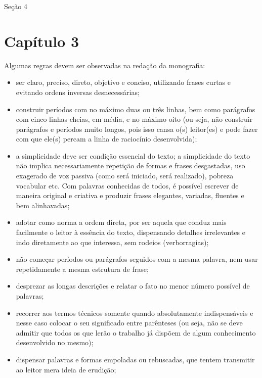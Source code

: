 \documentclass[
	12pt,			%
	openright,		%
	oneside,	
	a4paper,		%
	english,		%
	brazil			%
]{abntex2/abntex2}  %
\begin{document}
		Seção 4

\chapter{Capítulo 3}

	Algumas regras devem ser observadas na redação da monografia:

	\begin{itemize}
		\item ser claro, preciso, direto, objetivo e conciso, utilizando frases curtas e evitando ordens inversas desnecessárias;
		
		\item construir períodos com no máximo duas ou três linhas, bem como parágrafos com cinco linhas cheias, em média, e no máximo oito (ou seja, não construir parágrafos e períodos muito longos, pois isso cansa o(s) leitor(es) e pode fazer com que ele(s) percam a linha de raciocínio desenvolvida);
		
		\item a simplicidade deve ser condição essencial do texto; a simplicidade do texto não implica necessariamente repetição de formas e frases desgastadas, uso exagerado de voz passiva (como será iniciado, será realizado), pobreza vocabular etc. Com palavras conhecidas de todos, é possível escrever de maneira original e criativa e produzir frases elegantes, variadas, fluentes e bem alinhavadas;
		
		\item adotar como norma a ordem direta, por ser aquela que conduz mais facilmente o leitor à essência do texto, dispensando detalhes irrelevantes e indo diretamente ao que interessa, sem rodeios (verborragias);

		\item não começar períodos ou parágrafos seguidos com a mesma palavra, nem usar repetidamente a mesma estrutura de frase;

		\item desprezar as longas descrições e relatar o fato no menor número possível de palavras;
		
		\item recorrer aos termos técnicos somente quando absolutamente indispensáveis e nesse caso colocar o seu significado entre parênteses (ou seja, não se deve admitir que todos os que lerão o trabalho já dispõem de algum conhecimento desenvolvido no mesmo);
		
		\item dispensar palavras e formas empoladas ou rebuscadas, que tentem
transmitir ao leitor mera ideia de erudição;


\end{itemize}
\end{document}

